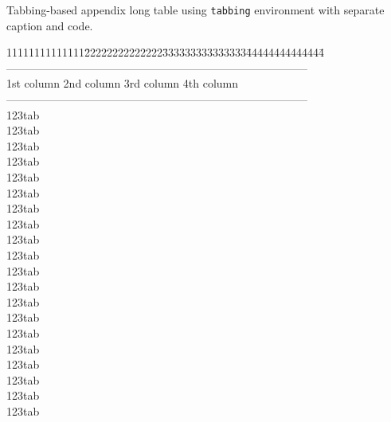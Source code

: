 \documentclass[phd]{ndsu-thesis-2022}
\begin{document}
\vspace{-2ex}
\begin{appendixtable}%
\caption[Tabbing-based appendix long table using \texttt{tabbing} environment with separate caption and code.]{Tabbing-based appendix long table using \texttt{tabbing} environment with separate caption and code. \vspace{-8ex}}%
\label{aplongtab3}%
\end{appendixtable}
\begingroup
\singlespacing
\begin{tabbing}
11111111111111\=22222222222222\=333333333333333\=44444444444444\=\kill
\>---------------------------------------------------------------------------------\\
\>\: 1st column  \>  2nd column  \>  3rd column \> 4th column\\
\>---------------------------------------------------------------------------------\\
\>\: 123tab      \\
\>\: 123tab      \\
\>\: 123tab      \\
\>\: 123tab      \\
\>\: 123tab      \\
\>\: 123tab      \\
\>\: 123tab      \\
\>\: 123tab      \\
\>\: 123tab      \\
\>\: 123tab      \\
\>\: 123tab      \\
\>\: 123tab      \\
\>\: 123tab    \\
\>\: 123tab    \\
\>\: 123tab    \\
\>\: 123tab    \\
\>\: 123tab    \\
\>\: 123tab    \\
\>\: 123tab    \\
\>\: 123tab    \\

\end{tabbing}
\end{document}
